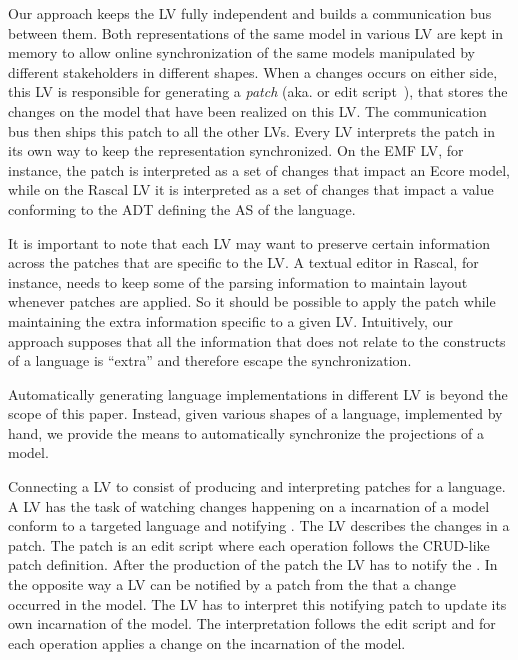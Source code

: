 Our approach keeps the LV fully independent and builds a communication bus between them.
Both representations of the same model in various LV are kept in memory to allow online synchronization of the same models manipulated by different stakeholders in different shapes.
When a changes occurs on either side, this LV is responsible for generating a \emph{patch} (aka. \de or edit script~\cite{rozen2017towards}), that stores the changes on the model that have been realized on this LV.
The communication bus then ships this patch to all the other LVs.
Every LV interprets the patch in its own way to keep the representation synchronized.
On the EMF LV, for instance, the patch is interpreted as a set of changes that impact an Ecore model, while on the Rascal LV it is interpreted as a set of changes that impact a value conforming to the ADT defining the AS of the language.

It is important to note that each LV may want to preserve certain information across the patches that are specific to the LV.
A textual editor in Rascal, for instance, needs to keep some of the parsing information to maintain layout whenever patches are applied.
So it should be possible to apply the patch while maintaining the extra information specific to a given LV.
Intuitively, our approach supposes that all the information that does not relate to the constructs of a language is ``extra'' and therefore escape the synchronization. 

Automatically generating language implementations in different LV is beyond the scope of this paper.
Instead, given various shapes of a language, implemented by hand, we provide the means to automatically synchronize the projections of a model.

Connecting a LV to \prism consist of producing and interpreting patches for a language.
A LV has the task of watching changes happening on a incarnation of a model conform to a targeted language and notifying \prism.
The LV describes the changes in a patch. The patch is an edit script where each operation follows the CRUD-like patch definition.
After the production of the patch the LV has to notify the \prism.
In the opposite way a LV can be notified by a patch from the \prism that a change occurred in the model.
The LV has to interpret this notifying patch to update its own incarnation of the model.
The interpretation follows the edit script and for each operation applies a change on the incarnation of the model.

